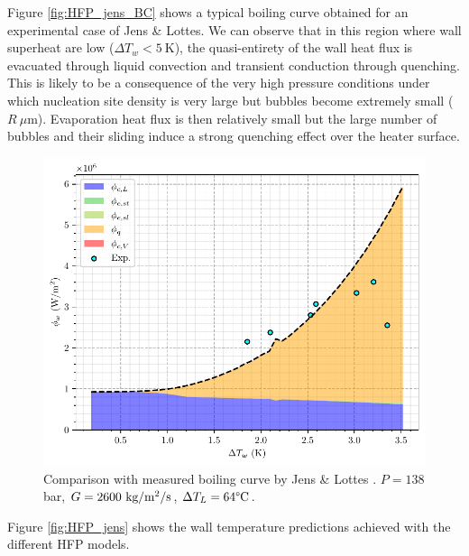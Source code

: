 Figure \ref{fig:HFP_jens_BC} shows a typical boiling curve obtained for an experimental case of Jens \& Lottes. We can observe that in this region where wall superheat are low ($\Delta T_{w}<5\ $K), the quasi-entirety of the wall heat flux is evacuated through liquid convection and transient conduction through quenching. This is likely to be a consequence of the very high pressure conditions under which nucleation site density is very large but bubbles become extremely small ($R ~\mu$m). Evaporation heat flux is then relatively small but the large number of bubbles and their sliding induce a strong quenching effect over the heater surface. 

\npar

\begin{figure}[!h]
\centering
\includegraphics[width=0.6\linewidth]{img/HFP/jens/jens_p138.pdf}
\caption{Comparison with measured boiling curve by Jens \& Lottes \cite{jens_analysis_1951}. $P=138$ bar, $G=2600~\text{kg/m$^{2}$/s}$, $\Delta T_{L}=64\degree\mathrm{C}$.}
\end{figure}
\npar

Figure \ref{fig:HFP_jens} shows the wall temperature predictions achieved with the different HFP models.

